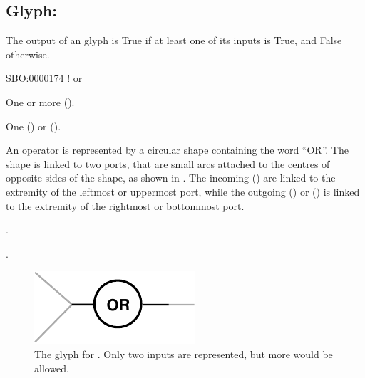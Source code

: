 \subsection{Glyph: }
\label{sec:or}

The output of an  glyph is True if at least one of its inputs is True, and False otherwise.

\begin{glyphDescription}

\glyphSboTerm
SBO:0000174 ! or

\glyphIncoming One or more  ().

\glyphOutgoing
One  () or  ().

\glyphContainer
An  operator is represented by a circular shape containing the word ``OR''.
The shape is linked to two ports, that are small arcs attached to the centres of opposite sides of the shape, as shown in .
The incoming  () are linked to the extremity of the leftmost or uppermost port, while the outgoing  () or  () is linked to the extremity of the rightmost or bottommost port.

\glyphLabel
{}.

\glyphAux
{}.

\end{glyphDescription}

\begin{figure}[H]
  \centering
  \includegraphics{images/build/or.pdf}
  \caption{The \PD glyph for . Only two inputs are represented, but more would be allowed.}
  \label{fig:or}
\end{figure}

